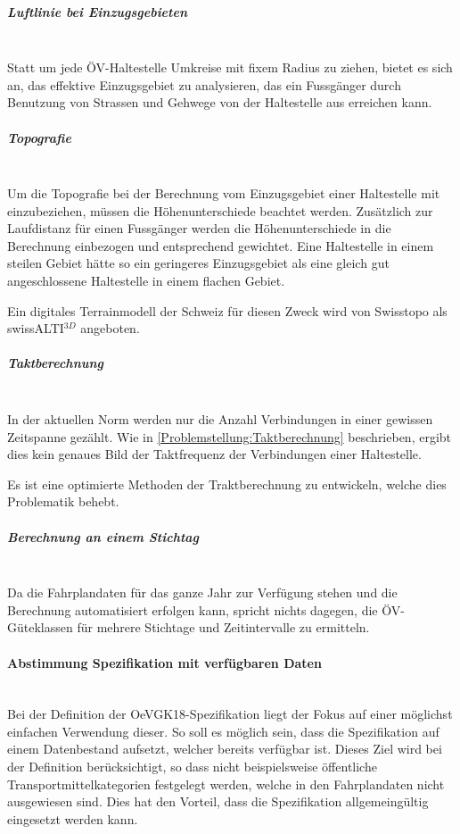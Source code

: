 \subparagraph{Luftlinie bei Einzugsgebieten}~\\
\label{Evaluierung grundlegender Verbesserungen:Luftlinie bei Einzugsgebieten}
Statt um jede \acs{ÖV}-Haltestelle Umkreise mit fixem Radius zu ziehen, bietet es sich an, das effektive Einzugsgebiet zu analysieren, das ein Fussgänger durch Benutzung von Strassen und Gehwege von der Haltestelle aus erreichen kann.

\subparagraph{Topografie}~\\
\label{Evaluierung grundlegender Verbesserungen:Topografie}
Um die Topografie bei der Berechnung vom Einzugsgebiet einer Haltestelle mit einzubeziehen, müssen die Höhenunterschiede beachtet werden.
Zusätzlich zur Laufdistanz für einen Fussgänger werden die Höhenunterschiede in die Berechnung einbezogen und entsprechend gewichtet.
Eine Haltestelle in einem steilen Gebiet hätte so ein geringeres Einzugsgebiet als eine gleich gut angeschlossene Haltestelle in einem flachen Gebiet.

Ein digitales \gls{Terrainmodell} der Schweiz für diesen Zweck wird von Swisstopo als swissALTI$^{3D}$ angeboten.~\cite{swissalti3d_swisstopo}

\subparagraph{Taktberechnung}~\\
\label{Evaluierung grundlegender Verbesserungen:Taktberechnung}
In der aktuellen Norm werden nur die Anzahl Verbindungen in einer gewissen Zeitspanne gezählt.
Wie in \ref{Problemstellung:Taktberechnung} beschrieben, ergibt dies kein genaues Bild der Taktfrequenz der Verbindungen einer Haltestelle.

Es ist eine optimierte Methoden der Traktberechnung zu entwickeln, welche dies Problematik behebt.

\subparagraph{Berechnung an einem Stichtag}~\\
\label{Evaluierung grundlegender Verbesserungen:Berechnung an einem Stichtag}
Da die Fahrplandaten für das ganze Jahr zur Verfügung stehen und die Berechnung automatisiert erfolgen kann, spricht nichts dagegen, die \acs{ÖV}-Güteklassen für mehrere Stichtage und Zeitintervalle zu ermitteln.

\paragraph{Abstimmung Spezifikation mit verfügbaren Daten}~\\
\label{Spezifikation OeVGK18:Abstimmung Spezifikation mit verfügbaren Daten}
Bei der Definition der \gls{OeVGK18}-Spezifikation liegt der Fokus auf einer möglichst einfachen Verwendung dieser. 
So soll es möglich sein, dass die Spezifikation auf einem Datenbestand aufsetzt, welcher bereits verfügbar ist.
Dieses Ziel wird bei der Definition berücksichtigt, so dass nicht beispielsweise öffentliche Transportmittelkategorien festgelegt werden, welche in den Fahrplandaten nicht ausgewiesen sind.
Dies hat den Vorteil, dass die Spezifikation allgemeingültig eingesetzt werden kann.


